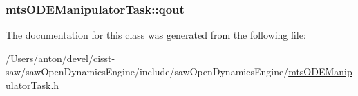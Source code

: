 \subsubsection[{qout}]{ mts\+O\+D\+E\+Manipulator\+Task\+::qout}\label{classmts_o_d_e_manipulator_task_a162ca16e37ce8838ff2214b8b33f4b84}


The documentation for this class was generated from the following file\+:\begin{DoxyCompactItemize}
\item 
/\+Users/anton/devel/cisst-\/saw/saw\+Open\+Dynamics\+Engine/include/saw\+Open\+Dynamics\+Engine/\hyperlink{mts_o_d_e_manipulator_task_8h}{mts\+O\+D\+E\+Manipulator\+Task.\+h}\end{DoxyCompactItemize}
